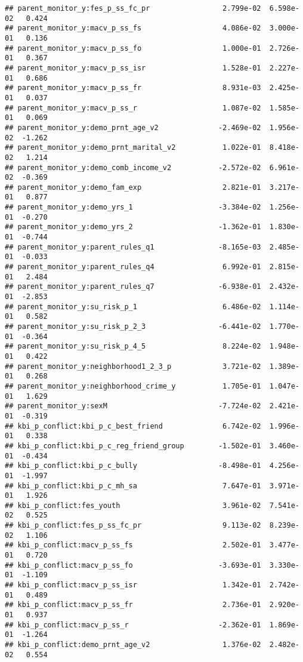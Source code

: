 \documentclass[
]{article}
\begin{document}
\begin{verbatim}
## parent_monitor_y:fes_p_ss_fc_pr                 2.799e-02  6.598e-02   0.424
## parent_monitor_y:macv_p_ss_fs                   4.086e-02  3.000e-01   0.136
## parent_monitor_y:macv_p_ss_fo                   1.000e-01  2.726e-01   0.367
## parent_monitor_y:macv_p_ss_isr                  1.528e-01  2.227e-01   0.686
## parent_monitor_y:macv_p_ss_fr                   8.931e-03  2.425e-01   0.037
## parent_monitor_y:macv_p_ss_r                    1.087e-02  1.585e-01   0.069
## parent_monitor_y:demo_prnt_age_v2              -2.469e-02  1.956e-02  -1.262
## parent_monitor_y:demo_prnt_marital_v2           1.022e-01  8.418e-02   1.214
## parent_monitor_y:demo_comb_income_v2           -2.572e-02  6.961e-02  -0.369
## parent_monitor_y:demo_fam_exp                   2.821e-01  3.217e-01   0.877
## parent_monitor_y:demo_yrs_1                    -3.384e-02  1.256e-01  -0.270
## parent_monitor_y:demo_yrs_2                    -1.362e-01  1.830e-01  -0.744
## parent_monitor_y:parent_rules_q1               -8.165e-03  2.485e-01  -0.033
## parent_monitor_y:parent_rules_q4                6.992e-01  2.815e-01   2.484
## parent_monitor_y:parent_rules_q7               -6.938e-01  2.432e-01  -2.853
## parent_monitor_y:su_risk_p_1                    6.486e-02  1.114e-01   0.582
## parent_monitor_y:su_risk_p_2_3                 -6.441e-02  1.770e-01  -0.364
## parent_monitor_y:su_risk_p_4_5                  8.224e-02  1.948e-01   0.422
## parent_monitor_y:neighborhood1_2_3_p            3.721e-02  1.389e-01   0.268
## parent_monitor_y:neighborhood_crime_y           1.705e-01  1.047e-01   1.629
## parent_monitor_y:sexM                          -7.724e-02  2.421e-01  -0.319
## kbi_p_conflict:kbi_p_c_best_friend              6.742e-02  1.996e-01   0.338
## kbi_p_conflict:kbi_p_c_reg_friend_group        -1.502e-01  3.460e-01  -0.434
## kbi_p_conflict:kbi_p_c_bully                   -8.498e-01  4.256e-01  -1.997
## kbi_p_conflict:kbi_p_c_mh_sa                    7.647e-01  3.971e-01   1.926
## kbi_p_conflict:fes_youth                        3.961e-02  7.541e-02   0.525
## kbi_p_conflict:fes_p_ss_fc_pr                   9.113e-02  8.239e-02   1.106
## kbi_p_conflict:macv_p_ss_fs                     2.502e-01  3.477e-01   0.720
## kbi_p_conflict:macv_p_ss_fo                    -3.693e-01  3.330e-01  -1.109
## kbi_p_conflict:macv_p_ss_isr                    1.342e-01  2.742e-01   0.489
## kbi_p_conflict:macv_p_ss_fr                     2.736e-01  2.920e-01   0.937
## kbi_p_conflict:macv_p_ss_r                     -2.362e-01  1.869e-01  -1.264
## kbi_p_conflict:demo_prnt_age_v2                 1.376e-02  2.482e-02   0.554

\end{verbatim}
\end{document}
